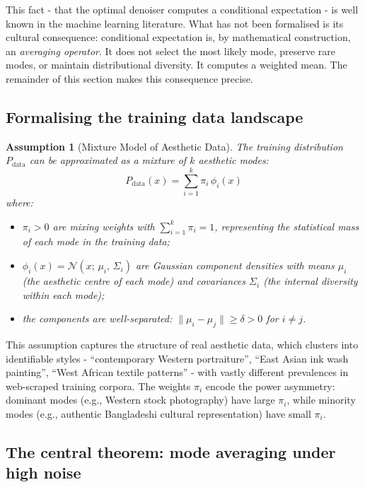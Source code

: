 \documentclass[11pt]{article}
\newtheorem{assumption}[theorem]{Assumption}
\begin{document}
This fact - that the optimal denoiser computes a conditional expectation - is well known in the machine learning literature. What has not been formalised is its cultural consequence: conditional expectation is, by mathematical construction, an \textit{averaging operator}. It does not select the most likely mode, preserve rare modes, or maintain distributional diversity. It computes a weighted mean. The remainder of this section makes this consequence precise.

\subsection{Formalising the training data landscape}

\begin{assumption}[Mixture Model of Aesthetic Data]\label{assum:mixture}
The training distribution $P_{\mathrm{data}}$ can be approximated as a mixture of $k$ aesthetic modes:
$$P_{\mathrm{data}}(x) = \sum_{i=1}^k \pi_i \, \phi_i(x)$$
where:
\begin{itemize}
 \item $\pi_i > 0$ are mixing weights with $\sum_{i=1}^k \pi_i = 1$, representing the \emph{statistical mass} of each mode in the training data;
 \item $\phi_i(x) = \mathcal{N}(x;\, \mu_i,\, \Sigma_i)$ are Gaussian component densities with means $\mu_i$ (the aesthetic centre of each mode) and covariances $\Sigma_i$ (the internal diversity within each mode);
 \item the components are well-separated: $\|\mu_i - \mu_j\| \geq \delta > 0$ for $i \neq j$.
\end{itemize}
\end{assumption}

This assumption captures the structure of real aesthetic data, which clusters into identifiable styles - ``contemporary Western portraiture'', ``East Asian ink wash painting'', ``West African textile patterns'' - with vastly different prevalences in web-scraped training corpora. The weights $\pi_i$ encode the power asymmetry: dominant modes (e.g., Western stock photography) have large $\pi_i$, while minority modes (e.g., authentic Bangladeshi cultural representation) have small $\pi_i$.

\subsection{The central theorem: mode averaging under high noise}
\end{document}
